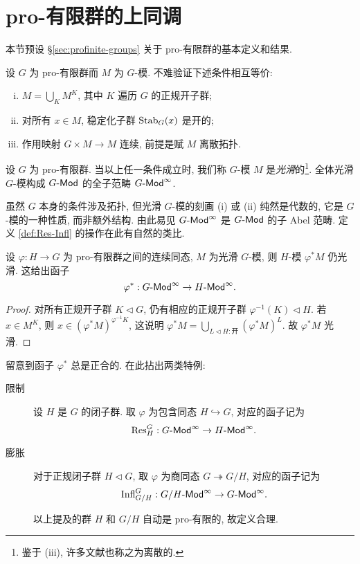\section{pro-有限群的上同调}\label{sec:profinite-cohomology}
本节预设 \S\ref{sec:profinite-groups} 关于 pro-有限群的基本定义和结果.

设 $G$ 为 pro-有限群而 $M$ 为 $G$-模. 不难验证下述条件相互等价:
\begin{enumerate}[(i)]
	\item $M = \bigcup_K M^K$, 其中 $K$ 遍历 $G$ 的正规开子群;
	\item 对所有 $x \in M$, 稳定化子群 $\operatorname{Stab}_G(x)$ 是开的;
	\item 作用映射 $G \times M \to M$ 连续, 前提是赋 $M$ 离散拓扑.
\end{enumerate}

\begin{definition}
	设 $G$ 为 pro-有限群. 当以上任一条件成立时, 我们称 $G$-模 $M$ 是\emph{光滑}的\footnote{鉴于 (iii), 许多文献也称之为离散的.}. 全体光滑 $G$-模构成 $G\text{-}\mathsf{Mod}$ 的全子范畴 $G\text{-}\mathsf{Mod}^\infty$.
\end{definition}

虽然 $G$ 本身的条件涉及拓扑, 但光滑 $G$-模的刻画 (i) 或 (ii) 纯然是代数的, 它是 $G$-模的一种性质, 而非额外结构. 由此易见 $G\text{-}\mathsf{Mod}^\infty$ 是 $G\text{-}\mathsf{Mod}$ 的子 Abel 范畴. 定义 \ref{def:Res-Infl} 的操作在此有自然的类比.

\begin{definition-proposition}
	设 $\varphi: H \to G$ 为 pro-有限群之间的连续同态, $M$ 为光滑 $G$-模, 则 $H$-模 $\varphi^* M$ 仍光滑. 这给出函子
	\[ \varphi^*: G\text{-}\mathsf{Mod}^\infty \to H\text{-}\mathsf{Mod}^\infty. \]
\end{definition-proposition}
\begin{proof}
	对所有正规开子群 $K \lhd G$, 仍有相应的正规开子群 $\varphi^{-1}(K) \lhd H$. 若 $x \in M^K$, 则 $x \in (\varphi^* M)^{\varphi^{-1} K}$, 这说明 $\varphi^* M = \bigcup_{L \lhd H: \text{开}} (\varphi^* M)^L$. 故 $\varphi^* M$ 光滑.
\end{proof}

留意到函子 $\varphi^*$ 总是正合的. 在此拈出两类特例:
\begin{description}
	\item[限制] 设 $H$ 是 $G$ 的闭子群. 取 $\varphi$ 为包含同态 $H \hookrightarrow G$, 对应的函子记为
	\[ \operatorname{Res}^G_H: G\text{-}\mathsf{Mod}^\infty \to H\text{-}\mathsf{Mod}^\infty. \]
	\item[膨胀] 对于正规闭子群 $H \lhd G$, 取 $\varphi$ 为商同态 $G \twoheadrightarrow G/H$, 对应的函子记为
	\[ \mathrm{Infl}^G_{G/H}: G/H\text{-}\mathsf{Mod}^\infty \to G\text{-}\mathsf{Mod}^\infty. \]
	
	以上提及的群 $H$ 和 $G/H$ 自动是 pro-有限的, 故定义合理.
\end{description}

